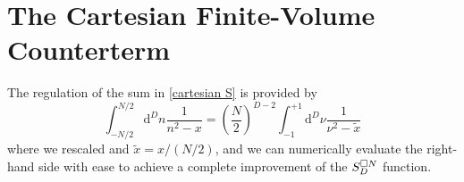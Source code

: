 \section{The Cartesian \Luscher Finite-Volume Counterterm}\label{sec:counterterm/cartesian}

The regulation of the sum in \eqref{cartesian S} is provided by
\begin{equation}
    \label{eq:cartesian S counterterm}
    \int_{-N/2}^{N/2} \mathrm{d}^Dn \frac{1}{n^2-x}
    =
    \left(\frac{N}{2}\right)^{D-2} \int_{-1}^{+1} \mathrm{d}^D\nu \frac{1}{\nu^2 - \tilde{x}}
\end{equation}
where we rescaled and $\tilde{x}=x/(N/2)$, and we can numerically evaluate the right-hand side with ease to achieve a complete improvement of the $S_D^{\square N}$ function.

